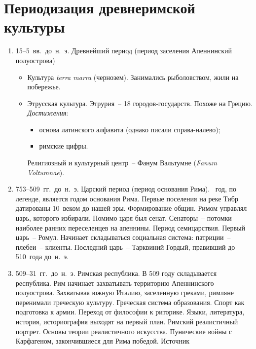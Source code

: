 \section{Периодизация древнеримской культуры}

  \begin{enumerate}
    \item 15--5~вв.~до~н.~э. Древнейший период (период заселения Апеннинский
      полуострова)
      \begin{itemize}
        \item Культура \emph{terra marra} (чернозем). Занимались рыболовством,
          жили на побережье.
        \item Этрусская культура. Этрурия~-- 18 городов-государств. Похоже на
          Грецию.
          \emph{Достижения}:
            \begin{itemize}
              \item основа латинского алфавита (однако писали справа-налево);
              \item римские цифры.
            \end{itemize}
          Религиозный и культурный центр~-- Фанум Вальтумне
            (\emph{Fanum Voltumnae}).
      \end{itemize}
    \item 753--509~гг.~до~н.~э. Царский период (период основания Рима).
      ~год, по легенде, является годом основания Рима. Первые поселения на
      реке Тибр датированы 10~веком до нашей эры. Формирование общин. Римом
      управлял царь, которого избирали. Помимо царя был сенат. Сенаторы~--
      потомки наиболее ранних переселенцев на апеннины.
      \medskip
      Период семицарствия. Первый царь~-- Ромул. Начинает складываться
      социальная система: патриции~-- плебеи~-- клиенты.
      \medskip
      Последний царь~-- Тарквиний Гордый, правивший до 510~года до~н.~э.
    \item 509--31~гг.~до~н.~э. Римская республика.
      \medskip
      В 509 году складывается республика. Рим начинает захватывать территорию
      Апеннинского полуострова. Захватывая южную Италию, заселенную греками,
      римляне перенимали греческую культуру. Греческая система образования.
      Спорт как подготовка к армии. Переход от философии к риторике. Языки,
      литература, история, историография выходят на первый план. Римский
      реалистичный портрет. Основы теории реалистичного искусства.
      \medskip
      Пунические войны с Карфагеном, закончившиеся для Рима победой. Источник

\end{enumerate}
